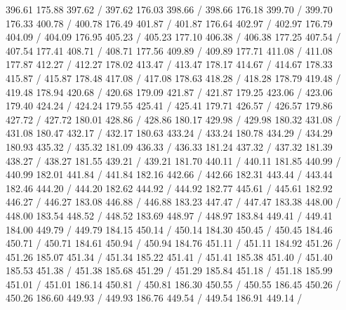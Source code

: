 { 396.61 175.88 397.62 /
 397.62 176.03 398.66 /
 398.66 176.18 399.70 /
 399.70 176.33 400.78 /
 400.78 176.49 401.87 /
 401.87 176.64 402.97 /
 402.97 176.79 404.09 /
 404.09 176.95 405.23 /
 405.23 177.10 406.38 /
 406.38 177.25 407.54 /
 407.54 177.41 408.71 /
 408.71 177.56 409.89 /
 409.89 177.71 411.08 /
 411.08 177.87 412.27 /
 412.27 178.02 413.47 /
 413.47 178.17 414.67 /
 414.67 178.33 415.87 /
 415.87 178.48 417.08 /
 417.08 178.63 418.28 /
 418.28 178.79 419.48 /
 419.48 178.94 420.68 /
 420.68 179.09 421.87 /
 421.87 179.25 423.06 /
 423.06 179.40 424.24 /
 424.24 179.55 425.41 /
 425.41 179.71 426.57 /
 426.57 179.86 427.72 /
 427.72 180.01 428.86 /
 428.86 180.17 429.98 /
 429.98 180.32 431.08 /
 431.08 180.47 432.17 /
 432.17 180.63 433.24 /
 433.24 180.78 434.29 /
 434.29 180.93 435.32 /
 435.32 181.09 436.33 /
 436.33 181.24 437.32 /
 437.32 181.39 438.27 /
 438.27 181.55 439.21 /
 439.21 181.70 440.11 /
 440.11 181.85 440.99 /
 440.99 182.01 441.84 /
 441.84 182.16 442.66 /
 442.66 182.31 443.44 /
 443.44 182.46 444.20 /
 444.20 182.62 444.92 /
 444.92 182.77 445.61 /
 445.61 182.92 446.27 /
 446.27 183.08 446.88 /
 446.88 183.23 447.47 /
 447.47 183.38 448.00 /
 448.00 183.54 448.52 /
 448.52 183.69 448.97 /
 448.97 183.84 449.41 /
 449.41 184.00 449.79 /
 449.79 184.15 450.14 /
 450.14 184.30 450.45 /
 450.45 184.46 450.71 /
 450.71 184.61 450.94 /
 450.94 184.76 451.11 /
 451.11 184.92 451.26 /
 451.26 185.07 451.34 /
 451.34 185.22 451.41 /
 451.41 185.38 451.40 /
 451.40 185.53 451.38 /
 451.38 185.68 451.29 /
 451.29 185.84 451.18 /
 451.18 185.99 451.01 /
 451.01 186.14 450.81 /
 450.81 186.30 450.55 /
 450.55 186.45 450.26 /
 450.26 186.60 449.93 /
 449.93 186.76 449.54 /
 449.54 186.91 449.14 /
}
